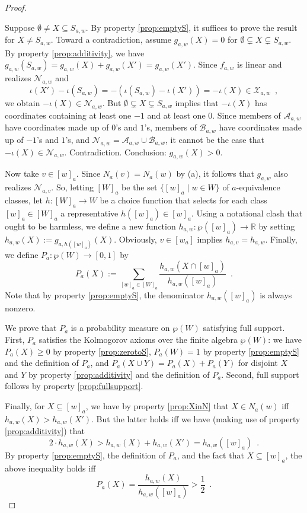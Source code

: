 \documentclass[12pt]{article}
\theoremstyle{definition}
\begin{document}
\begin{proof}
\begin{enumerate}
    Suppose $\emptyset\neq X\subseteq S_{a,w}$. By property
    \ref{prop:emptyS}, it suffices to prove the result for $X\neq
    S_{a,w}$. Toward a contradiction, assume $g_{a,w}(X)=0$ for
    $\emptyset\subsetneq X\subsetneq S_{a,w}$.  By property
    \ref{prop:additivity}, we have
    $g_{a,w}(S_{a,w})=g_{a,w}(X)+g_{a,w}(X')=g_{a,w}(X')$.  Since
    $f_{a,w}$ is linear and realizes $\mathcal{N}_{a,w}$ and
    \[
    \iota(X')-\iota(S_{a,w}) = -(\iota(S_{a,w})-\iota(X')) =
    -\iota(X)\in\mathcal{X}_{a,w}\enspace,
    \]
    we obtain $-\iota(X)\in\mathcal{N}_{a,w}$.  But
    $\emptyset\subsetneq X\subsetneq S_{a,w}$ implies that $-\iota(X)$
    has coordinates containing at least one $-1$ and at least one $0$.
    Since members of $\mathcal{A}_{a,w}$ have coordinates made up of
    $0$'s and $1$'s, members of $\mathcal{B}_{a,w}$ have coordinates
    made up of $-1$'s and $1$'s, and
    $\mathcal{N}_{a,w}=\mathcal{A}_{a,w} \cup \mathcal{B}_{a,w}$, it
    cannot be the case that $-\iota(X)\in\mathcal{N}_{a,w}$.
    Contradiction.  Conclusion: $g_{a,w}(X)>0$.
  \end{enumerate}

  Now take $v\in[w]_a$.  Since $N_a(v)=N_a(w)$ by (a), it follows that
  $g_{a,w}$ also realizes $\mathcal{N}_{a,v}$.  So, letting $[W]_a$ be
  the set $\{[w]_a\mid w\in W\}$ of $a$-equivalence classes, let
  $h:[W]_a\to W$ be a choice function that selects for each class
  $[w]_a\in[W]_a$ a representative $h([w]_a)\in[w]_a$. Using a
  notational clash that ought to be harmless, we define a new function
  $h_{a,w}:\wp([w]_a)\to\mathbb{R}$ by setting
  $h_{a,w}(X):=g_{a,h([w]_a)}(X)$.  Obviously, $v\in[w_a]$ implies
  $h_{a,v}=h_{a,w}$.  Finally, we define $P_a:\wp(W)\to[0,1]$ by
  \[
  P_a(X):= \sum_{[w]_a\in[W]_a} \frac {h_{a,w}(X\cap[w]_a)}
  {h_{a,w}([w]_a)}\enspace.
  \]
  Note that by property \ref{prop:emptyS}, the denominator
  $h_{a,w}([w]_a)$ is always nonzero.

  We prove that $P_a$ is a probability measure on $\wp(W)$ satisfying
  full support. First, $P_a$ satisfies the Kolmogorov axioms over the
  finite algebra $\wp(W)$: we have $P_a(X)\geq 0$ by property
  \ref{prop:zerotoS}, $P_a(W)=1$ by property \ref{prop:emptyS} and the
  definition of $P_a$, and $P_a(X\cup Y)=P_a(X)+P_a(Y)$ for disjoint
  $X$ and $Y$ by property \ref{prop:additivity} and the definition of
  $P_a$.  Second, full support follows by property
  \ref{prop:fullsupport}.

  Finally, for $X\subseteq[w]_a$, we have by property \ref{prop:XinN}
  that $X\in N_a(w)$ iff $h_{a,w}(X)>h_{a,w}(X')$.  But the latter
  holds iff we have (making use of property \ref{prop:additivity})
  that
  \[
  2\cdot h_{a,w}(X)>h_{a,w}(X)+h_{a,w}(X')=h_{a,w}([w]_a)\enspace.
  \]
  By property \ref{prop:emptyS}, the definition of $P_a$, and the fact
  that $X\subseteq[w]_a$, the above inequality holds iff
  \[
  P_a(X)=\frac{h_{a,w}(X)}{h_{a,w}([w]_a)}>\textstyle \frac
  12\enspace.
  \]
\end{proof}
\end{document}
